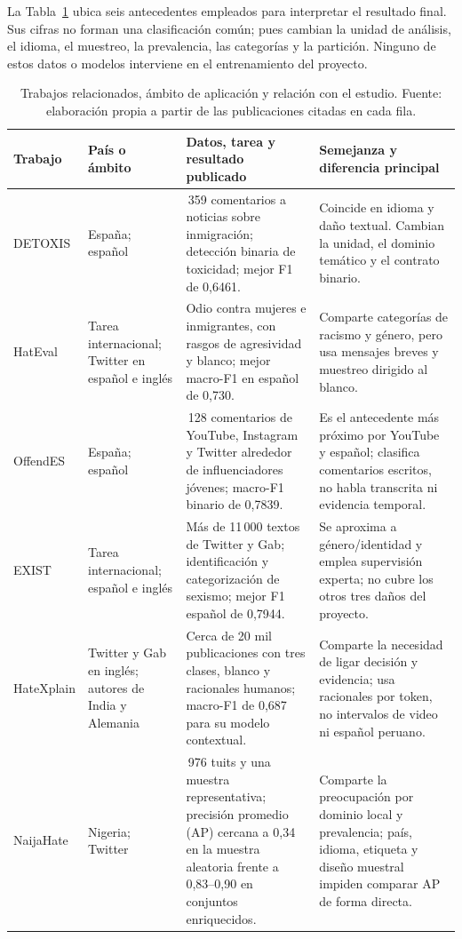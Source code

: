 La Tabla~\ref{tab:estado_arte} ubica seis antecedentes empleados para interpretar el resultado final. Sus cifras no forman una clasificación común; pues cambian la unidad de análisis, el idioma, el muestreo, la prevalencia, las categorías y la partición. Ninguno de estos datos o modelos interviene en el entrenamiento del proyecto.

\begin{table}[t]
\centering
\caption{Trabajos relacionados, ámbito de aplicación y relación con el estudio. Fuente: elaboración propia a partir de las publicaciones citadas en cada fila.}
\label{tab:estado_arte}
\scriptsize
\begin{tabularx}{\textwidth}{>{\bfseries\raggedright\arraybackslash}p{20mm}>{\raggedright\arraybackslash}p{31mm}>{\raggedright\arraybackslash}p{57mm}X}
\toprule
\textbf{Trabajo} & \textbf{País o ámbito} & \textbf{Datos, tarea y resultado publicado} & \textbf{Semejanza y diferencia principal} \\
\midrule
DETOXIS \cite{taule2021detoxis} & España; español & 4\,359 comentarios a noticias sobre inmigración; detección binaria de toxicidad; mejor F1 de 0,6461. & Coincide en idioma y daño textual. Cambian la unidad, el dominio temático y el contrato binario. \\
HatEval \cite{basile2019hateval} & Tarea internacional; Twitter en español e inglés & Odio contra mujeres e inmigrantes, con rasgos de agresividad y blanco; mejor macro-F1 en español de 0,730. & Comparte categorías de racismo y género, pero usa mensajes breves y muestreo dirigido al blanco. \\
OffendES \cite{plaza2021offendes} & España; español & 47\,128 comentarios de YouTube, Instagram y Twitter alrededor de influenciadores jóvenes; macro-F1 binario de 0,7839. & Es el antecedente más próximo por YouTube y español; clasifica comentarios escritos, no habla transcrita ni evidencia temporal. \\
EXIST \cite{rodriguez2021exist} & Tarea internacional; español e inglés & Más de 11\,000 textos de Twitter y Gab; identificación y categorización de sexismo; mejor F1 español de 0,7944. & Se aproxima a género/identidad y emplea supervisión experta; no cubre los otros tres daños del proyecto. \\
HateXplain \cite{mathew2021hatexplain} & Twitter y Gab en inglés; autores de India y Alemania & Cerca de 20 mil publicaciones con tres clases, blanco y racionales humanos; macro-F1 de 0,687 para su modelo contextual. & Comparte la necesidad de ligar decisión y evidencia; usa racionales por token, no intervalos de video ni español peruano. \\
NaijaHate \cite{tonneau2024naijahate} & Nigeria; Twitter & 35\,976 tuits y una muestra representativa; precisión promedio (AP) cercana a 0,34 en la muestra aleatoria frente a 0,83--0,90 en conjuntos enriquecidos. & Comparte la preocupación por dominio local y prevalencia; país, idioma, etiqueta y diseño muestral impiden comparar AP de forma directa. \\
\bottomrule
\end{tabularx}
\end{table}

